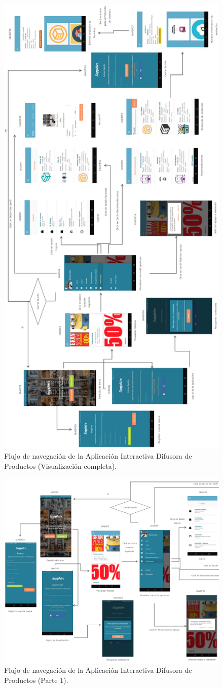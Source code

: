 \FloatBarrier
\begin{figure}[htbp!]
		\centering
			\includegraphics[width=.5 \textwidth]{imagenes/mapaNavNuevo}
		\caption{Flujo de navegación de la Aplicación Interactiva Difusora de Productos (Visualización completa).}
		\label{image:map1}
\end{figure}
\FloatBarrier
\FloatBarrier
\begin{figure}[htbp!]
		\centering
			\includegraphics[width=1 \textwidth]{imagenes/mapaNavNuevoP1}
		\caption{Flujo de navegación de la Aplicación Interactiva Difusora de Productos (Parte 1).}
		\label{image:map2}
\end{figure}
